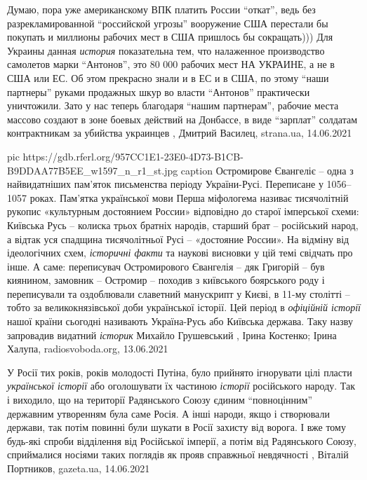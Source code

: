 Думаю, пора уже американскому ВПК платить России \enquote{откат}, ведь без
разрекламированной \enquote{российской угрозы} вооружение США перестали бы покупать и
миллионы рабочих мест в США пришлось бы сокращать))) Для Украины данная \emph{история}
показательна тем, что налаженное производство самолетов марки \enquote{Антонов}, это 80
000 рабочих мест НА УКРАИНЕ, а не в США или ЕС.  Об этом прекрасно знали и в ЕС
и в США, по этому \enquote{наши партнеры} руками продажных шкур во власти \enquote{Антонов}
практически уничтожили. Зато у нас теперь благодаря \enquote{нашим партнерам}, рабочие
места массово создают в зоне боевых действий на Донбассе, в виде \enquote{зарплат}
солдатам контрактникам за убийства украинцев
, 
Дмитрий Василец, strana.ua, 14.06.2021

\ifcmt
  pic https://gdb.rferl.org/957CC1E1-23E0-4D73-B1CB-B9DDAA77B5EE_w1597_n_r1_st.jpg
	caption Остромирове Євангеліє – одна з найвидатніших пам’яток письменства періоду України-Русі. Переписане у 1056–1057 роках. Пам'ятка української мови
\fi
Перша міфологема називає тисячолітній рукопис «культурным достоянием России»
відповідно до старої імперської схеми: Київська Русь – колиска трьох братніх
народів, старший брат – російський народ, а відтак уся спадщина тисячолітньої
Русі – «достояние России».  На відміну від ідеологічних схем, \emph{історичні факти}
та наукові висновки у цій темі свідчать про інше. А саме: переписувач
Остромирового Євангелія – дяк Григорій – був киянином, замовник – Остромир –
походив з київського боярського роду і переписували та оздоблювали славетний
манускрипт у Києві, в 11-му столітті – тобто за великокнязівської доби
української історії. Цей період в \emph{офіційній історії} нашої країни сьогодні
називають Україна-Русь або Київська держава. Таку назву запровадив видатний
\emph{історик} Михайло Грушевський
,
Ірина Костенко; Ірина Халупа, radiosvoboda.org, 13.06.2021

У Росії тих років, років молодості Путіна, було прийнято ігнорувати цілі пласти
\emph{української історії} або оголошувати їх частиною \emph{історії} російського народу. Так
і виходило, що на території Радянського Союзу єдиним \enquote{повноцінним} державним
утворенням була саме Росія. А інші народи, якщо і створювали держави, так потім
повинні були шукати в Росії захисту від ворога. І вже тому будь-які спроби
відділення від Російської імперії, а потім від Радянського Союзу, сприймалися
носіями таких поглядів як прояв справжньої невдячності
, 
Віталій Портников, gazeta.ua, 14.06.2021

